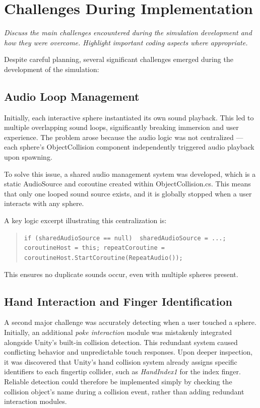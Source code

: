 \section{Challenges During Implementation} 
\emph{Discuss the main challenges encountered during the simulation development and how they were overcome. Highlight important coding aspects where appropriate.}

Despite careful planning, several significant challenges emerged during the development of the simulation:

\subsection{Audio Loop Management} Initially, each interactive sphere instantiated its own sound playback. This led to multiple overlapping sound loops, significantly breaking immersion and user experience. The problem arose because the audio logic was not centralized — each sphere's ObjectCollision component independently triggered audio playback upon spawning.

To solve this issue, a shared audio management system was developed, which is a static AudioSource and coroutine created within ObjectCollision.cs. This means that only one looped sound source exists, and it is globally stopped when a user interacts with any sphere.

A key logic excerpt illustrating this centralization is:

\begin{quote} \small \texttt{if (sharedAudioSource == null) { sharedAudioSource = ...; coroutineHost = this; repeatCoroutine = coroutineHost.StartCoroutine(RepeatAudio());}} \end{quote}

This ensures no duplicate sounds occur, even with multiple spheres present.

\subsection{Hand Interaction and Finger Identification} 
A second major challenge was accurately detecting when a user touched a sphere. Initially, an additional \textit{poke interaction} module was mistakenly integrated alongside Unity's built-in collision detection. This redundant system caused conflicting behavior and unpredictable touch responses. Upon deeper inspection, it was discovered that Unity’s hand collision system already assigns specific identifiers to each fingertip collider, such as \textit{HandIndex1} for the index finger. Reliable detection could therefore be implemented simply by checking the collision object's name during a collision event, rather than adding redundant interaction modules.

